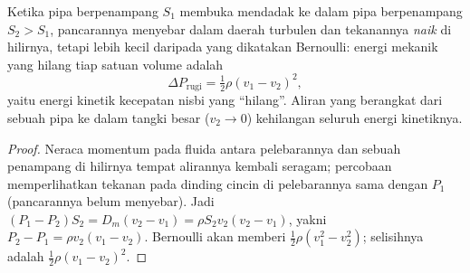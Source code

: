 \begin{proposition}\label{prop:b2:flow-balances:borda}
Ketika pipa berpenampang $S_1$ membuka mendadak ke dalam pipa berpenampang $S_2
> S_1$, pancarannya menyebar dalam daerah turbulen dan tekanannya
\emph{naik} di hilirnya, tetapi lebih kecil daripada yang dikatakan Bernoulli:
energi mekanik yang hilang tiap satuan volume adalah
\[
\Delta P_{\text{rugi}} = \tfrac12\rho(v_1 - v_2)^2 ,
\]
yaitu energi kinetik kecepatan nisbi yang ``hilang''. Aliran yang berangkat dari
sebuah pipa ke dalam tangki besar ($v_2 \to 0$) kehilangan seluruh energi kinetiknya.
\end{proposition}

\begin{proof}
Neraca momentum pada fluida antara pelebarannya dan sebuah penampang di
hilirnya tempat alirannya kembali seragam; percobaan memperlihatkan
tekanan pada dinding cincin di pelebarannya sama dengan $P_1$ (pancarannya belum
menyebar). Jadi $(P_1 - P_2)S_2 = D_m(v_2 - v_1) = \rho S_2v_2(v_2 -
v_1)$, yakni $P_2 - P_1 = \rho v_2(v_1 - v_2)$. Bernoulli akan memberi
$\tfrac12\rho(v_1^2 - v_2^2)$; selisihnya adalah $\tfrac12\rho(v_1 - v_2)^2$.
\end{proof}

